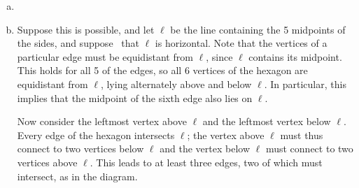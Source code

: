 \begin{enumerate}[(a)]
\item {}

\item Suppose this is possible, and let $\ell$ be the line containing the 5 midpoints of the sides, and suppose \wlg\ that $\ell$ is horizontal. Note that the vertices of a particular edge must be equidistant from $\ell$, since $\ell$ contains its midpoint. This holds for all 5 of the edges, so all 6 vertices of the hexagon are equidistant from $\ell$, lying alternately above and below $\ell$. In particular, this implies that the midpoint of the sixth edge also lies on $\ell$.

Now consider the leftmost vertex above $\ell$ and the leftmost vertex below $\ell$. Every edge of the hexagon intersects $\ell$; the vertex above $\ell$ must thus connect to two vertices below $\ell$ and the vertex below $\ell$ must connect to two vertices above $\ell$. This leads to at least three edges, two of which must intersect, as in the diagram. 


\end{enumerate}